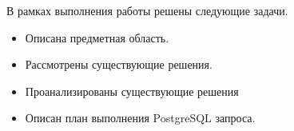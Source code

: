 \Conclusion %

В рамках выполнения работы решены следующие задачи.

\begin{itemize}
	\item Описана предметная область.
	\item Рассмотрены существующие решения.
	\item Проанализированы существующие решения
	\item Описан план выполнения PostgreSQL запроса.
\end{itemize}